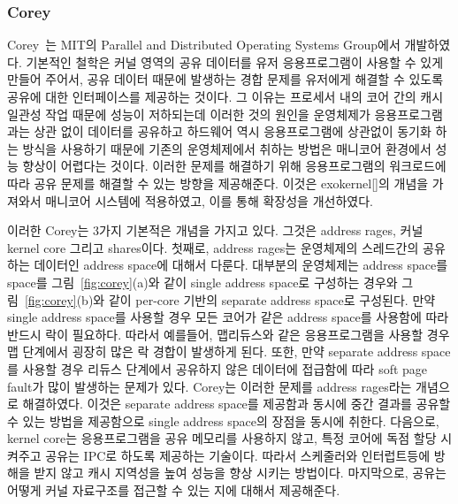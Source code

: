 \subsubsection{Corey}

Corey~\cite{Boyd-WickizerCorey}는 MIT의 Parallel and Distributed Operating Systems
Group에서 개발하였다.
기본적인 철학은 커널 영역의 공유 데이터를 유저 응용프로그램이 사용할 수 있게 만들어 주어서, 
공유 데이터 때문에 발생하는 경합 문제를 유저에게 해결할 수 있도록 공유에 대한 인터페이스를 제공하는 것이다. 
그 이유는 프로세서 내의 코어 간의 캐시 일관성 작업 때문에 성능이 저하되는데 이러한 것의 원인을 
운영체제가 응용프로그램과는 상관 없이 데이터를 공유하고 하드웨어 역시 응용프로그램에 상관없이 동기화 하는 
방식을 사용하기 때문에 기존의 운영체제에서 취하는 방법은 매니코어 환경에서 성능 향상이 어렵다는 것이다.  
이러한 문제를 해결하기 위해 응용프로그램의 워크로드에 따라 공유 문제를 해결할 수 있는 방향을 제공해준다.
이것은 exokernel[]의 개념을 가져와서 매니코어 시스템에 적용하였고, 이를 통해 확장성을 개선하였다.

이러한 Corey는 3가지 기본적은 개념을 가지고 있다. 그것은 address rages, 커널 kernel core 그리고 shares이다.
첫째로, address rages는 운영체제의 스레드간의 공유하는 데이터인 address space에 대해서 다룬다.
대부분의 운영체제는 address space를 space를 그림~\ref{fig:corey}(a)와 같이 single address space로
구성하는 경우와  그림~\ref{fig:corey}(b)와 같이 per-core 기반의 separate address space로 구성된다.
만약 single address space를 사용할 경우 모든 코어가 같은 address space를 사용함에 따라 반드시 락이 필요하다.
따라서 예를들어, 맵리듀스와 같은 응용프로그램을 사용할 경우 맵 단계에서 굉장히 많은 락 경합이 발생하게 된다.
또한, 만약 separate address space를 사용할 경우 리듀스 단계에서 공유하지 않은 데이터에 접급함에 따라
soft page fault가 많이 발생하는 문제가 있다.
Corey는 이러한 문제를 address rages라는 개념으로 해결하였다. 
이것은 separate address space를 제공함과 동시에 중간 결과를 공유할 수 있는 방법을 제공함으로 single address
space의 장점을 동시에 취한다.
다음으로, kernel core는 응용프로그램을 공유 메모리를 사용하지 않고, 특정 코어에 
독점 할당 시켜주고 공유는 IPC로 하도록 제공하는 기술이다. 
따라서 스케줄러와 인터럽트등에 방해을 받지 않고 캐시 지역성을 높여 성능을 향상 시키는 방법이다.
마지막으로, 공유는 어떻게 커널 자료구조를 접근할 수 있는 지에 대해서 제공해준다.

